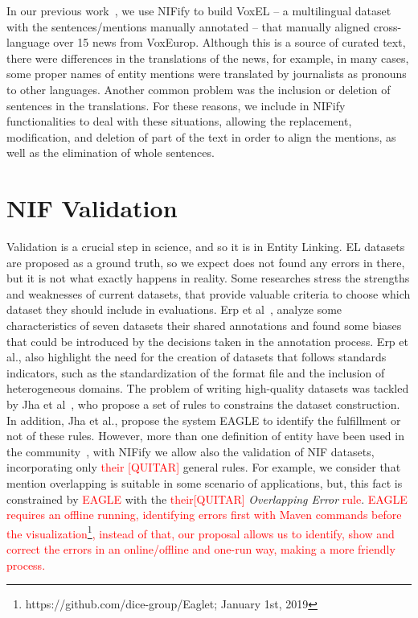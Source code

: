\documentclass[sigconf]{acmart}
\begin{document}
In our previous work~\cite{VoxEL2018}, we use NIFify to build VoxEL -- a multilingual dataset with the sentences/mentions manually annotated -- that manually aligned cross-language over 15 news from VoxEurop. Although this is a source of curated text, there were differences in the translations of the news, for example, in many cases, some proper names of entity mentions were translated by journalists as pronouns to other languages. Another common problem was the inclusion or deletion of sentences in the translations. For these reasons, we include in NIFify functionalities to deal with these situations, allowing the replacement, modification, and deletion of part of the text in order to align the mentions, as well as the elimination of whole sentences. 

\section{NIF Validation}

Validation is a crucial step in science, and so it is in Entity Linking. EL datasets are proposed as a ground truth, so we expect does not found any errors in there, but it is not what exactly happens in reality. Some researches stress the strengths and weaknesses of current datasets, that provide valuable criteria to choose which dataset they should include in evaluations. Erp et al~\cite{Marieke2016}, analyze some characteristics of seven datasets their shared annotations and found some biases that could be introduced by the decisions taken in the annotation process. Erp et al., also highlight the need for the creation of datasets that follows standards indicators, such as the standardization of the format file and the inclusion of heterogeneous domains. The problem of writing high-quality datasets was tackled by Jha et al~\cite{Kunal2017}, who propose a set of rules to constrains the dataset construction. In addition, Jha et al., propose the system EAGLE to identify the fulfillment or not of these rules. However, more than one definition of entity have been used in the community~\cite{ourAMW2018}, with NIFify we allow also the validation of NIF datasets, incorporating only \textcolor{red}{their [QUITAR]} general rules. For example, we consider that mention overlapping is suitable in some scenario of applications, but, this fact is constrained by \textcolor{red}{EAGLE} with the \textcolor{red}{their[QUITAR]} \textit{Overlapping Error} \textcolor{red}{rule}. \textcolor{red}{EAGLE requires an offline running, identifying errors first with Maven commands before the visualization\footnote{https://github.com/dice-group/Eaglet; January 1st, 2019}, instead of that, our proposal allows us to identify, show and correct the errors in an online/offline and one-run way, making a more friendly process.}
\end{document}
